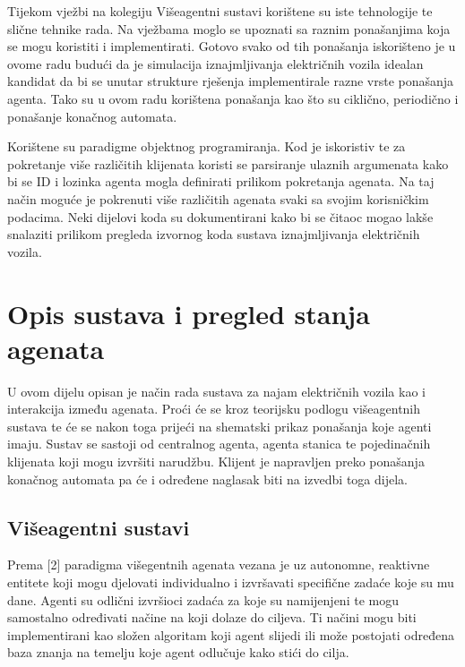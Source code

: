 \documentclass{foi}
\begin{document}
Tijekom vježbi na kolegiju Višeagentni sustavi korištene su iste tehnologije te slične tehnike rada. Na vježbama moglo se upoznati sa raznim ponašanjima koja se mogu koristiti i implementirati. Gotovo svako od tih ponašanja iskorišteno je u ovome radu budući da je simulacija iznajmljivanja električnih vozila idealan kandidat da bi se unutar strukture rješenja implementirale razne vrste ponašanja agenta. Tako su u ovom radu korištena ponašanja kao što su ciklično, periodično i ponašanje konačnog automata. 

Korištene su paradigme objektnog programiranja. Kod je iskoristiv te za pokretanje više različitih klijenata koristi se parsiranje ulaznih argumenata kako bi se ID i lozinka agenta mogla definirati prilikom pokretanja agenata. Na taj način moguće je pokrenuti više različitih agenata svaki sa svojim korisničkim podacima. Neki dijelovi koda su dokumentirani kako bi se čitaoc mogao lakše snalaziti prilikom pregleda izvornog koda sustava iznajmljivanja električnih vozila.

\chapter{Opis sustava i pregled stanja agenata}

U ovom dijelu opisan je način rada sustava za najam električnih vozila kao i interakcija između agenata. Proći će se kroz teorijsku podlogu višeagentnih sustava te će se nakon toga prijeći na shematski prikaz ponašanja koje agenti imaju. Sustav se sastoji od centralnog agenta, agenta stanica te pojedinačnih klijenata koji mogu izvršiti narudžbu. Klijent je napravljen preko ponašanja konačnog automata pa će i određene naglasak biti na izvedbi toga dijela.

\section{Višeagentni sustavi}

Prema [2] paradigma višegentnih agenata vezana je uz autonomne, reaktivne entitete koji mogu djelovati individualno i izvršavati specifične zadaće koje su mu dane. Agenti su odlični izvršioci zadaća za koje su namijenjeni te mogu samostalno određivati načine na koji dolaze do ciljeva. Ti načini mogu biti implementirani kao složen algoritam koji agent slijedi ili može postojati određena baza znanja na temelju koje agent odlučuje kako stići do cilja.
\end{document}
